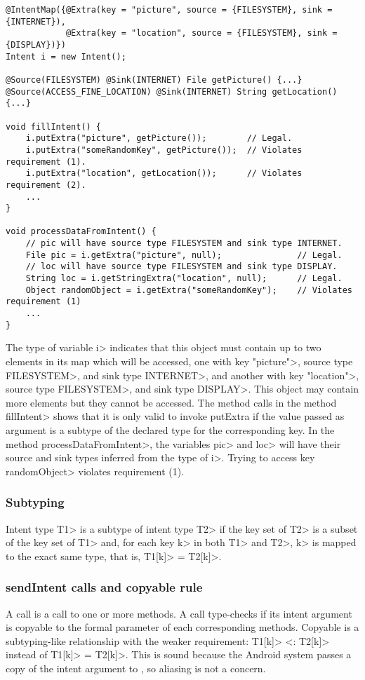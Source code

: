 \begin{Verbatim}
@IntentMap({@Extra(key = "picture", source = {FILESYSTEM}, sink = {INTERNET}),
            @Extra(key = "location", source = {FILESYSTEM}, sink = {DISPLAY})}) 
Intent i = new Intent();

@Source(FILESYSTEM) @Sink(INTERNET) File getPicture() {...}
@Source(ACCESS_FINE_LOCATION) @Sink(INTERNET) String getLocation() {...}

void fillIntent() {
    i.putExtra("picture", getPicture());        // Legal.
    i.putExtra("someRandomKey", getPicture());  // Violates requirement (1).
    i.putExtra("location", getLocation());      // Violates requirement (2).
    ...
}

void processDataFromIntent() {
    // pic will have source type FILESYSTEM and sink type INTERNET.
    File pic = i.getExtra("picture", null);               // Legal.
    // loc will have source type FILESYSTEM and sink type DISPLAY.
    String loc = i.getStringExtra("location", null);      // Legal.
    Object randomObject = i.getExtra("someRandomKey");    // Violates requirement (1)
    ...
}
\end{Verbatim}

\noindent
The type of variable \<i> indicates that this object must contain up to two
elements in its map which
will be accessed, one with key \<"picture">, source type \<FILESYSTEM>, and sink type
\<INTERNET>, and another with key \<"location">, source type \<FILESYSTEM>, and sink
type \<DISPLAY>. This object may contain more elements but they cannot be
accessed. The method calls in the method \<fillIntent> shows that it is only
valid to invoke putExtra if the value passed as argument is a subtype of the
declared type for the corresponding key. In the method \<processDataFromIntent>,
the variables \<pic> and \<loc> will have their source and sink types
inferred from the type of \<i>. Trying to access key \<randomObject> violates
requirement (1).


\subsubsection{Subtyping}
Intent type \<T1> is a subtype of intent type \<T2> if the key set of 
\<T2> is a subset of the key set of \<T1> and, for each key \<k> in both 
\<T1> and \<T2>, \<k> is mapped to the exact same type, that is, 
\<T1[k]> = \<T2[k]>.

\subsubsection{sendIntent calls and copyable rule}
A \sendIntent{} call is a call to one or more \onReceive{} methods.
A \sendIntent{} call type-checks if its intent argument is
copyable to the formal parameter of each corresponding \onReceive{} methods.
Copyable is a subtyping-like relationship with the weaker requirement: 
\<T1[k]> <: \<T2[k]> instead of \<T1[k]> = \<T2[k]>.
This is sound because the Android system passes a copy of the intent argument to
\onReceive{}, so aliasing is not a concern.

